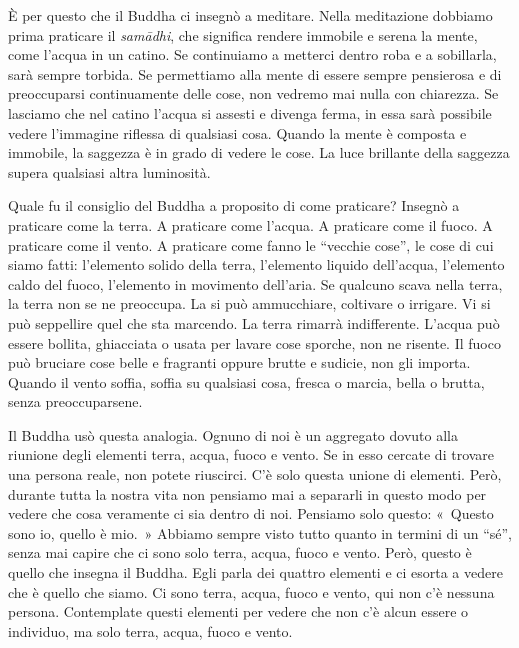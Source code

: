 È per questo che il Buddha ci insegnò a meditare. Nella meditazione
dobbiamo prima praticare il \emph{samādhi}, che significa rendere
immobile e serena la mente, come l'acqua in un catino. Se continuiamo a
metterci dentro roba e a sobillarla, sarà sempre torbida. Se permettiamo
alla mente di essere sempre pensierosa e di preoccuparsi continuamente
delle cose, non vedremo mai nulla con chiarezza. Se lasciamo che nel
catino l'acqua si assesti e divenga ferma, in essa sarà possibile vedere
l'immagine riflessa di qualsiasi cosa. Quando la mente è composta e
immobile, la saggezza è in grado di vedere le cose. La luce brillante
della saggezza supera qualsiasi altra luminosità.

Quale fu il consiglio del Buddha a proposito di come praticare? Insegnò
a praticare come la terra. A praticare come l'acqua. A praticare come il
fuoco. A praticare come il vento. A praticare come fanno le ``vecchie
cose'', le cose di cui siamo fatti: l'elemento solido della terra,
l'elemento liquido dell'acqua, l'elemento caldo del fuoco, l'elemento
in movimento dell'aria. Se qualcuno scava nella terra, la terra non se
ne preoccupa. La si può ammucchiare, coltivare o irrigare. Vi si può
seppellire quel che sta marcendo. La terra rimarrà indifferente. L'acqua
può essere bollita, ghiacciata o usata per lavare cose sporche, non ne
risente. Il fuoco può bruciare cose belle e fragranti oppure brutte e
sudicie, non gli importa. Quando il vento soffia, soffia su qualsiasi
cosa, fresca o marcia, bella o brutta, senza preoccuparsene.

Il Buddha usò questa analogia. Ognuno di noi è un aggregato dovuto alla
riunione degli elementi terra, acqua, fuoco e vento. Se in esso cercate
di trovare una persona reale, non potete riuscirci. C'è solo questa
unione di elementi. Però, durante tutta la nostra vita non pensiamo mai
a separarli in questo modo per vedere che cosa veramente ci sia dentro
di noi. Pensiamo solo questo: «~Questo sono io, quello è mio.~» Abbiamo
sempre visto tutto quanto in termini di un ``sé'', senza mai capire che
ci sono solo terra, acqua, fuoco e vento. Però, questo è quello che
insegna il Buddha. Egli parla dei quattro elementi e ci esorta a vedere
che è quello che siamo. Ci sono terra, acqua, fuoco e vento, qui non c'è
nessuna persona. Contemplate questi elementi per vedere che non c'è
alcun essere o individuo, ma solo terra, acqua, fuoco e vento.

